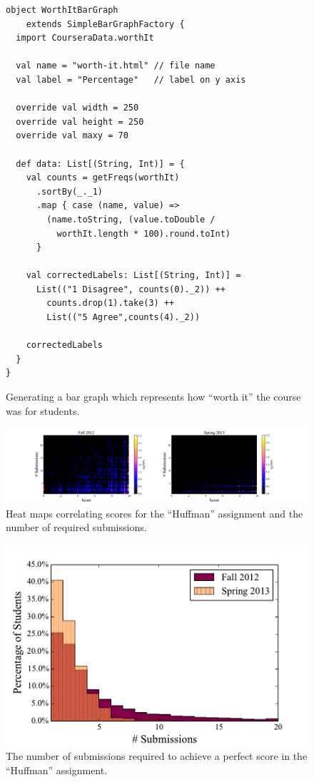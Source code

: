 \documentclass{sig-alternate}
\begin{document}
\begin{figure}[ht!]
  \begin{lstlisting}
object WorthItBarGraph
    extends SimpleBarGraphFactory {
  import CourseraData.worthIt

  val name = "worth-it.html" // file name
  val label = "Percentage"   // label on y axis

  override val width = 250
  override val height = 250
  override val maxy = 70

  def data: List[(String, Int)] = {
    val counts = getFreqs(worthIt)
      .sortBy(_._1)
      .map { case (name, value) =>
        (name.toString, (value.toDouble /
          worthIt.length * 100).round.toInt)
      }

    val correctedLabels: List[(String, Int)] =
      List(("1 Disagree", counts(0)._2)) ++
        counts.drop(1).take(3) ++
        List(("5 Agree",counts(4)._2))

    correctedLabels
  }
}
  \end{lstlisting}
  \caption{Generating a bar graph which
    represents how ``worth it'' the course was for students.}

  \label{fig:bar-chart}
\end{figure}

\begin{figure}[ht!]
  \centering
  \includegraphics[width=\textwidth]{plots/score-2d-histogram-fall2012-spring2013.pdf}
  \caption{Heat maps correlating scores for the ``Huffman'' assignment and the number
  of required submissions.}
  \label{fig:2d-histogram}
\end{figure}

\begin{figure}[ht!]
  \centering
  \includegraphics[width=\columnwidth]{plots/top-scores-submissions-histogram.pdf}
  \caption{The number of submissions required to achieve a perfect score in the ``Huffman'' assignment.}
  \label{fig:top-scores-submissions}
\end{figure}
\end{document}
